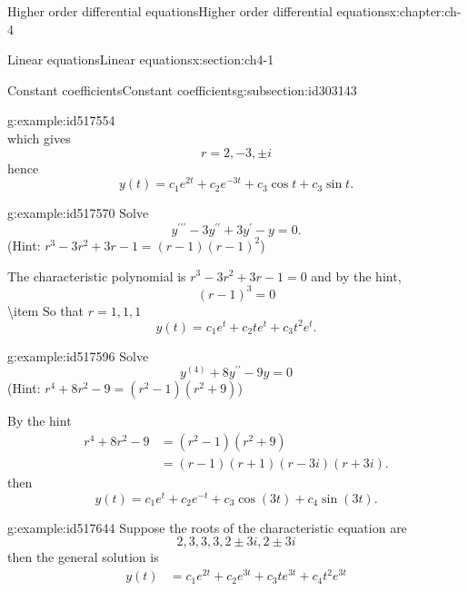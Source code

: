 \documentclass[oneside,10pt,]{book}
\numberwithin{equation}{section}
\numberwithin{equation}{section}
\newcommand{\amp}{&}
\begin{document}
\begin{chapterptx}{Higher order differential equations}{}{Higher order differential equations}{}{}{x:chapter:ch-4}
\begin{sectionptx}{Linear equations}{}{Linear equations}{}{}{x:section:ch4-1}
\begin{subsectionptx}{Constant coefficients}{}{Constant coefficients}{}{}{g:subsection:id303143}
\begin{example}{}{g:example:id517554}
\begin{equation*}
\end{equation*}
which gives%
\begin{equation*}
r=2,-3,\pm i
\end{equation*}
hence%
\begin{equation*}
y(t)=c_{1}e^{2t}+c_{2}e^{-3t}+c_{3}\cos t+c_{3}\sin t.
\end{equation*}
%
\end{example}
\begin{example}{}{g:example:id517570}%
Solve%
\begin{equation*}
y^{\prime\prime\prime}-3y^{\prime\prime}+3y^{\prime}-y=0.
\end{equation*}
(Hint: \(r^{3}-3r^{2}+3r-1=\left(r-1\right)\left(r-1\right)^{2}\))%
\par
The characteristic polynomial is \(r^{3}-3r^{2}+3r-1=0\) and by the hint,%
\begin{equation*}
\left(r-1\right)^{3}=0
\end{equation*}
\textbackslash{}item So that \(r=1,1,1\)%
\begin{equation*}
y(t)=c_{1}e^{t}+c_{2}te^{t}+c_{3}t^{2}e^{t}.
\end{equation*}
%
\end{example}
\begin{example}{}{g:example:id517596}%
Solve%
\begin{equation*}
y^{(4)}+8y^{\prime\prime}-9y=0
\end{equation*}
(Hint: \(r^{4}+8r^{2}-9=\left(r^{2}-1\right)\left(r^{2}+9\right)\))%
\par
By the hint%
\begin{align*}
r^{4}+8r^{2}-9 \amp =\left(r^{2}-1\right)\left(r^{2}+9\right)\\
\amp =\left(r-1\right)\left(r+1\right)\left(r-3i\right)\left(r+3i\right).
\end{align*}
then%
\begin{equation*}
y(t)=c_{1}e^{t}+c_{2}e^{-t}+c_{3}\cos(3t)+c_{4}\sin(3t).
\end{equation*}
%
\end{example}
\begin{example}{}{g:example:id517644}%
Suppose the roots of the characteristic equation are%
\begin{equation*}
2,3,3,3,2\pm3i,2\pm3i
\end{equation*}
then the general solution is%
\begin{align*}
y(t) \amp =c_{1}e^{2t}+c_{2}e^{3t}+c_{3}te^{3t}+c_{4}t^{2}e^{3t}\\

\end{align*}
\end{example}
\end{subsectionptx}
\end{sectionptx}
\end{chapterptx}
\end{document}
